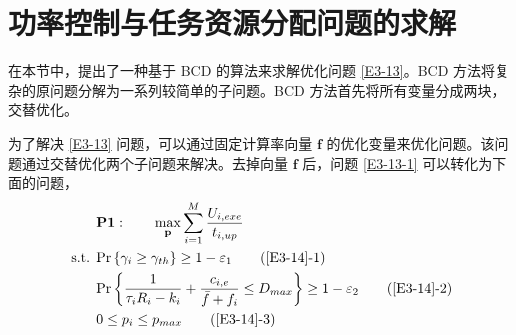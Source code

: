 \section{功率控制与任务资源分配问题的求解}\label{section3-3}
在本节中，提出了一种基于 BCD 的算法来求解优化问题 \eqref{E3-13}。BCD 方法将复杂的原问题分解为一系列较简单的子问题。BCD 方法首先将所有变量分成两块，交替优化。

为了解决 \eqref{E3-13} 问题，可以通过固定计算率向量 $\mathbf{f}$ 的优化变量来优化问题。该问题通过交替优化两个子问题来解决。去掉向量 $\mathbf{f}$ 后，问题 \eqref{E3-13-1} 可以转化为下面的问题，
\begin{align}
& \textbf{P1}:\qquad\max\limits_{\mathbf{p}}\sum_{i=1}^{M}\frac{U_{i,exe}}{t_{i,up}}                                  \label{E3-14}\\
\text { s.t. }
& \textrm{Pr}\left\{\gamma_i\geq\gamma_{th}\right\}\geq1-\varepsilon_1                                         \tag{\ref{E3-14}{-1}}      \label{E3-14-1}\\  %
& \textrm{Pr}\left\{\frac{1}{\tau_iR_i-k_i}+\frac{c_{i,e}}{\bar{f}+f_i}\le D_{max}\right\}\geq1-\varepsilon_2  \tag{\ref{E3-14}{-2}}      \label{E3-14-2}\\  %
& 0\le p_i\le p_{max}                                                                                          \tag{\ref{E3-14}{-3}}      \label{E3-14-3}  %
\end{align}

